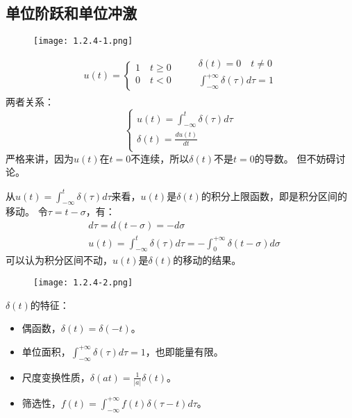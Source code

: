 \subsection{单位阶跃和单位冲激}

\begin{figure}[h]
\centering
\texttt{[image: 1.2.4-1.png]}
\end{figure}
\[
u\left( t \right) =\begin{cases}
	1 \quad t\geqslant 0\\
	0 \quad t<0\\
\end{cases} \qquad \begin{array}{l}
	\delta \left( t \right) =0 \quad t\ne 0\\
	\int_{-\infty}^{+\infty}{\delta \left( \tau \right) d\tau}=1\\
\end{array}
\]
两者关系：
\[
\begin{cases}
	u\left( t \right) =\int_{-\infty}^t{\delta \left( \tau \right) d\tau}\\
	\delta \left( t \right) =\frac{du\left( t \right)}{dt}\\
\end{cases}
\]
严格来讲，因为$u\left( t \right) $在$t=0$不连续，所以$\delta \left( t \right) $不是$t=0$的导数。
但不妨碍讨论。

从$u\left( t \right) =\int_{-\infty}^t{\delta \left( \tau \right) d\tau}$来看，$u\left( t \right) $是$\delta \left( t \right) $的积分上限函数，即是积分区间的移动。
令$\tau =t-\sigma $，有：
\begin{align*}
&d\tau =d\left( t-\sigma \right) =-d\sigma \\
&u\left( t \right) =\int_{-\infty}^t{\delta \left( \tau \right) d\tau}=-\int_0^{+\infty}{\delta \left( t-\sigma \right) d\sigma}
\end{align*}
可以认为积分区间不动，$u\left( t \right) $是$\delta \left( t \right) $的移动的结果。
\begin{figure}[h]
\centering
\texttt{[image: 1.2.4-2.png]}
\end{figure}

$\delta \left( t \right) $的特征：
\begin{itemize}
    \item 偶函数，$\delta \left( t \right) =\delta \left( -t \right) $。
    \item 单位面积，$\int_{-\infty}^{+\infty}{\delta \left( \tau \right) d\tau}=1$，也即能量有限。
    \item 尺度变换性质，$\delta \left( at \right) =\frac{1}{\left| a \right|}\delta \left( t \right) $。
    \item 筛选性，$f\left( t \right) =\int_{-\infty}^{+\infty}{f\left( t \right) \delta \left( \tau -t \right) d\tau}$。
\end{itemize}

